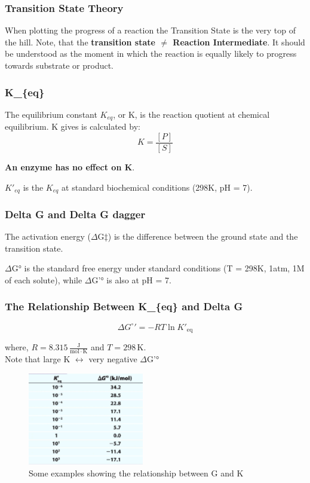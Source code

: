 \documentclass[../main.tex]{subfiles}
\begin{document}
\subsubsection{\gls{Transition State Theory}}
When plotting the progress of a reaction the \gls{Transition State} is the very top of the hill. Note, that the \textbf{transition state $\neq$ \gls{Reaction Intermediate}}. It should be understood as the moment in which the reaction is equally likely to progress towards substrate or product.




\subsubsection{\gls{K_{eq}}}
The equilibrium constant $K_{eq}$, or K, is the reaction quotient at chemical equilibrium. K gives is calculated by:
\begin{equation}
	K = \frac{[P]}{[S]}
\end{equation}

\textbf{An enzyme has no effect on K}.

$K'_{eq}$ is the $K_{eq}$ at standard biochemical conditions (298K, pH = 7).


\subsubsection{\gls{Delta G} and \gls{Delta G dagger}}

The activation energy ($\Delta$G$\ddagger$) is the difference between the ground state and the transition state.

$\Delta$G° is the standard free energy under standard conditions (T = 298K, 1atm, 1M of each solute), while $\Delta$G'° is also at pH = 7.
\subsubsection{The Relationship Between \gls{K_{eq}} and \gls{Delta G}}
\begin{equation}
	\Delta G^\circ{}' = -RT \ln K'_{\mathrm{eq}}
\end{equation}

where, \( R = 8.315\, \frac{\mathrm{J}}{\mathrm{mol \cdot K}} \) and \( T = 298\, \mathrm{K} \). \\

Note that large K $\leftrightarrow$ very negative $\Delta$G'°

\begin{figure}[h]
	\centering
	\includegraphics[width=0.45\textwidth]{G_and_K}
	\caption{Some examples showing the relationship between G and K}
\end{figure}
\end{document}
